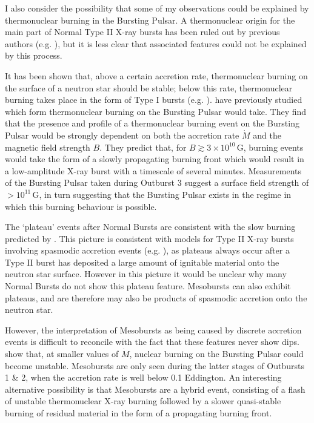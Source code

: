 \label{sec:nuc}

\par I also consider the possibility that some of my observations could be explained by thermonuclear burning in the Bursting Pulsar.  A thermonuclear origin for the main part of Normal Type II X-ray bursts has been ruled out by previous authors (e.g. \citealp{Lewin_BP}), but it is less clear that associated features could not be explained by this process.
\par It has been shown that, above a certain accretion rate, thermonuclear burning on the surface of a neutron star should be stable; below this rate, thermonuclear burning takes place in the form of Type I bursts (e.g. \citealp{Fujimoto_Shellstab,Bildsten_Regimes}).  \citet{Bildsten_Nuclear} have previously studied which form thermonuclear burning on the Bursting Pulsar would take.  They find that the presence and profile of a thermonuclear burning event on the Bursting Pulsar would be strongly dependent on both the accretion rate $\dot{M}$ and the magnetic field strength $B$.  They predict that, for $B\gtrsim3\times10^{10}$\,G, burning events would take the form of a slowly propagating burning front which would result in a low-amplitude X-ray burst with a timescale of several minutes.  Measurements of the Bursting Pulsar taken during Outburst 3 suggest a surface field strength of $>10^{11}$\,G, in turn suggesting that the Bursting Pulsar exists in the regime in which this burning behaviour is possible.
\par The `plateau' events after Normal Bursts are consistent with the slow burning predicted by \citet{Bildsten_Nuclear}.  This picture is consistent with models for Type II X-ray bursts involving spasmodic accretion events (e.g. \citealp{Spruit_Type2Mod,Walker_Type2Mod}), as plateaus always occur after a Type II burst has deposited a large amount of ignitable material onto the neutron star surface.  However in this picture it would be unclear why many Normal Bursts do not show this plateau feature.  Mesobursts can also exhibit plateaus, and are therefore may also be products of spasmodic accretion onto the neutron star.
\par However, the interpretation of Mesobursts as being caused by discrete accretion events is difficult to reconcile with the fact that these features never show dips.  \citet{Bildsten_Nuclear} show that, at smaller values of $\dot{M}$, nuclear burning on the Bursting Pulsar could become unstable.  Mesobursts are only seen during the latter stages of Outbursts 1 \& 2, when the accretion rate is well below 0.1 Eddington.  An interesting alternative possibility is that Mesobursts are a hybrid event, consisting of a flash of unstable thermonuclear X-ray burning followed by a slower quasi-stable burning of residual material in the form of a propagating burning front.
